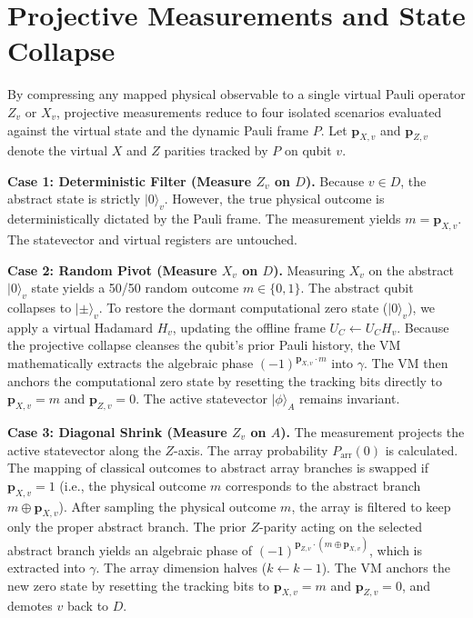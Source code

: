 \documentclass[11pt]{article}
\begin{document}
\section{Projective Measurements and State Collapse}
\label{sec:measurements}

By compressing any mapped physical observable to a single virtual Pauli operator $Z_v$ or $X_v$, projective measurements reduce to four isolated scenarios evaluated against the virtual state and the dynamic Pauli frame $P$. Let $\mathbf{p}_{X,v}$ and $\mathbf{p}_{Z,v}$ denote the virtual $X$ and $Z$ parities tracked by $P$ on qubit $v$.

\textbf{Case 1: Deterministic Filter (Measure $Z_v$ on $D$).}
Because $v \in D$, the abstract state is strictly $|0\rangle_v$. However, the true physical outcome is deterministically dictated by the Pauli frame. The measurement yields $m = \mathbf{p}_{X,v}$. The statevector and virtual registers are untouched.

\textbf{Case 2: Random Pivot (Measure $X_v$ on $D$).}
Measuring $X_v$ on the abstract $|0\rangle_v$ state yields a 50/50 random outcome $m \in \{0, 1\}$. The abstract qubit collapses to $|\pm\rangle_v$. To restore the dormant computational zero state ($|0\rangle_v$), we apply a virtual Hadamard $H_v$, updating the offline frame $U_C \leftarrow U_C H_v$. Because the projective collapse cleanses the qubit's prior Pauli history, the VM mathematically extracts the algebraic phase $(-1)^{\mathbf{p}_{X,v} \cdot m}$ into $\gamma$. The VM then anchors the computational zero state by resetting the tracking bits directly to $\mathbf{p}_{X,v} = m$ and $\mathbf{p}_{Z,v} = 0$. The active statevector $|\phi\rangle_A$ remains invariant.

\textbf{Case 3: Diagonal Shrink (Measure $Z_v$ on $A$).}
The measurement projects the active statevector along the $Z$-axis. The array probability $P_{\text{arr}}(0)$ is calculated. The mapping of classical outcomes to abstract array branches is swapped if $\mathbf{p}_{X,v} = 1$ (i.e., the physical outcome $m$ corresponds to the abstract branch $m \oplus \mathbf{p}_{X,v}$). After sampling the physical outcome $m$, the array is filtered to keep only the proper abstract branch. The prior $Z$-parity acting on the selected abstract branch yields an algebraic phase of $(-1)^{\mathbf{p}_{Z,v} \cdot (m \oplus \mathbf{p}_{X,v})}$, which is extracted into $\gamma$. The array dimension halves ($k \leftarrow k-1$). The VM anchors the new zero state by resetting the tracking bits to $\mathbf{p}_{X,v} = m$ and $\mathbf{p}_{Z,v} = 0$, and demotes $v$ back to $D$.
\end{document}
